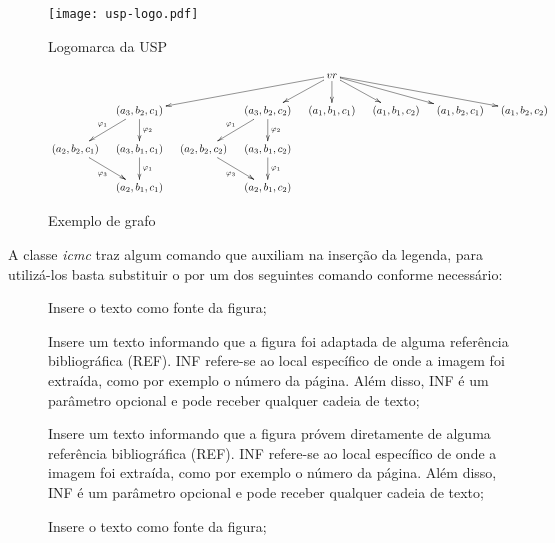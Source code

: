 \begin{figure}[htb]
 \caption{Logomarca da USP}
 \label{fig:logomarca_usp}
 \centering
 \texttt{[image: usp-logo.pdf]}
\end{figure}


\begin{figure}[htb]
\caption{Exemplo de grafo}
\label{figura:exemplo_grafo}
\centering
\begin{scriptsize}
$$
\xymatrix@R20pt@C10pt{
 & & & & vr \ar[dlll] \ar[dl] \ar[d] \ar[dr] \ar[drr] \ar[drrr] & & & \\
 & (a_3, b_2, c_1) \ar[d]^{\varphi_2} \ar[dl]_{\varphi_1} & & (a_3, b_2, c_2) \ar[d]^{\varphi_2} \ar[dl]_{\varphi_1} & (a_1, b_1, c_1) & (a_1, b_1, c_2) & (a_1, b_2, c_1) & (a_1, b_2, c_2) \\
 (a_2, b_2, c_1) \ar[dr]_{\varphi_3} & (a_3, b_1, c_1) \ar[d]^{\varphi_1} & (a_2, b_2, c_2) \ar[dr]_{\varphi_3} & (a_3, b_1, c_2) \ar[d]^{\varphi_1} & & & & \\
& (a_2, b_1, c_1)  & & (a_2, b_1, c_2) & & & & \\
}
$$
\end{scriptsize}
\fautor
\end{figure}

A classe \textit{icmc} traz algum comando que auxiliam na inserção da legenda, para utilizá-los basta substituir o  por um dos seguintes comando conforme necessário:

\begin{description}

 \item[] Insere o texto  como fonte da figura;

 \item[] Insere um texto informando que a figura foi adaptada de alguma referência bibliográfica (REF). INF refere-se ao local específico de onde a imagem foi extraída, como por exemplo o número da página. Além disso, INF é um parâmetro opcional e pode receber qualquer cadeia de texto;

 \item[] Insere um texto informando que a figura próvem diretamente de alguma referência bibliográfica (REF). INF refere-se ao local específico de onde a imagem foi extraída, como por exemplo o número da página. Além disso, INF é um parâmetro opcional e pode receber qualquer cadeia de texto;
 
 \item[] Insere o texto  como fonte da figura;
 
\end{description}



